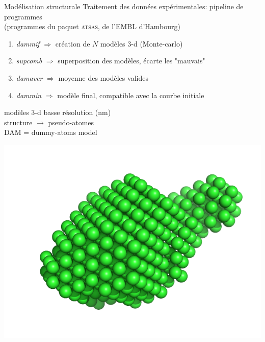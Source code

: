\documentclass{beamer}
\begin{document}
\begin{frame}{Mod\'elisation structurale}
Traitement des donn\'ees exp\'erimentales: pipeline de programmes\\
(programmes du paquet \textsc{atsas}, de l'EMBL d'Hambourg)
\begin{enumerate}
  \item \textit{dammif} $\Rightarrow$ cr\'eation de $N$ mod\`eles 3-d 
    (Monte-carlo)
  \item \textit{supcomb} $\Rightarrow$ superposition des mod\`eles, \'ecarte 
    les "mauvais"
  \item \textit{damaver} $\Rightarrow$ moyenne des mod\`eles valides
  \item \textit{dammin} $\Rightarrow$ mod\`ele final, compatible avec la 
    courbe initiale
\end{enumerate}

\begin{minipage}{0.50\linewidth}
    mod\`eles 3-d basse r\'esolution (nm)\\
    structure $\rightarrow$ pseudo-atomes\\
    DAM = dummy-atoms model
\end{minipage}
\begin{minipage}{0.45\linewidth}
    \begin{center}
    \vspace{-0.3cm}
    \hspace{-0.4cm}
    \includegraphics[scale=0.3]{model.png}
    \end{center}
\end{minipage}

\end{frame}
\end{document}
